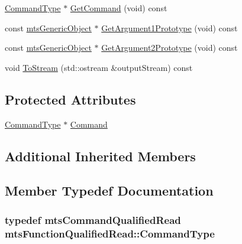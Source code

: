 \begin{DoxyCompactItemize}
\item 
\hyperlink{classmts_function_qualified_read_ae78bcee54ee0392f510d2f33600c316f}{Command\+Type} $\ast$ \hyperlink{classmts_function_qualified_read_a4ccdb978f5633cd5c791f9830341c65c}{Get\+Command} (void) const 
\item 
const \hyperlink{classmts_generic_object}{mts\+Generic\+Object} $\ast$ \hyperlink{classmts_function_qualified_read_a0775c24702c6168fa9a51187a3c199dc}{Get\+Argument1\+Prototype} (void) const 
\item 
const \hyperlink{classmts_generic_object}{mts\+Generic\+Object} $\ast$ \hyperlink{classmts_function_qualified_read_a5fa40186a3f0a87890d38db5ff63c4ce}{Get\+Argument2\+Prototype} (void) const 
\item 
void \hyperlink{classmts_function_qualified_read_afd4e7f95358d09fab3f63f0c2e3ed1ef}{To\+Stream} (std\+::ostream \&output\+Stream) const 
\end{DoxyCompactItemize}
\subsection*{Protected Attributes}
\begin{DoxyCompactItemize}
\item 
\hyperlink{classmts_function_qualified_read_ae78bcee54ee0392f510d2f33600c316f}{Command\+Type} $\ast$ \hyperlink{classmts_function_qualified_read_a7ac0f02300ec56afa037eefb3cb55cef}{Command}
\end{DoxyCompactItemize}
\subsection*{Additional Inherited Members}


\subsection{Member Typedef Documentation}
\hypertarget{classmts_function_qualified_read_ae78bcee54ee0392f510d2f33600c316f}{}
\subsubsection[{Command\+Type}]{\setlength{\rightskip}{0pt plus 5cm}typedef {\bf mts\+Command\+Qualified\+Read} {\bf mts\+Function\+Qualified\+Read\+::\+Command\+Type}}\label{classmts_function_qualified_read_ae78bcee54ee0392f510d2f33600c316f}


